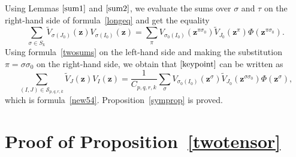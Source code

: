 \documentclass[10pt,a4paper]{amsart}
\numberwithin{equation}{section}
\begin{document}
Using Lemmas $\ref{sum1}$ and $\ref{sum2}$, we evaluate the sums over $\sigma$ and $\tau$ on the right-hand side of formula~\eqref{longeq} and get the equality
\begin{equation}\label{keypoint}
\sum_{\sigma\in S_k} \widetilde{V}_{\sigma(J_0)}(\boldsymbol{z}) V_{\sigma(I_0)}(\boldsymbol{z} )=\sum_{\pi} V_{\sigma_0(I_0)}(\boldsymbol{z}^{\pi\sigma_0})\widetilde{V}_{J_0}(\boldsymbol{z}^{\pi})\Phi(\boldsymbol{z}^{\pi\sigma_0}).
\end{equation}
Using formula~\eqref{twosums} on the left-hand side and making the substitution $\pi=\sigma\sigma_0$ on the right-hand side, we obtain that $\eqref{keypoint}$ can be written as
\begin{equation*}
\sum_{(I,J)\in \mathcal{S}_{p,q,r,k}}\widetilde{V}_J( \boldsymbol{z}) V_I(\boldsymbol{z})=\frac{1}{C_{p,q,r,k}} \sum_{\sigma} V_{\sigma_0(I_0)}(\boldsymbol{z}^{\sigma})\widetilde{V}_{J_0}(\boldsymbol{z}^{\sigma\sigma_0})\Phi(\boldsymbol{z}^{ \sigma}),
\end{equation*}
which is formula~\eqref{new54}. Proposition~\ref{symprop} is proved.

\appendix

\section{Proof of Proposition~\ref{twotensor}}\label{appendixA}
\end{document}
